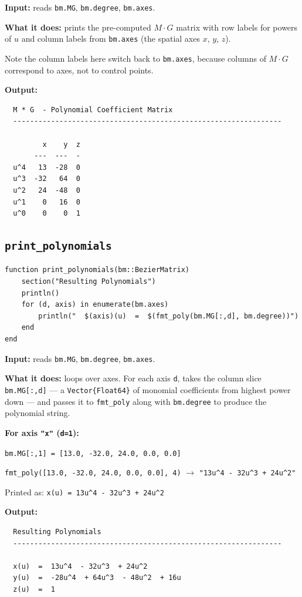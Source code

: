 \documentclass[12pt, a4paper]{article}
\newcommand{\cd}[1]{\texttt{#1}}
\begin{document}
\textbf{Input:} reads \cd{bm.MG}, \cd{bm.degree}, \cd{bm.axes}.

\textbf{What it does:} prints the pre-computed $M \cdot G$
matrix with row labels for powers of $u$ and column labels
from \cd{bm.axes} (the spatial axes $x$, $y$, $z$).

Note the column labels here switch back to \cd{bm.axes},
because columns of $M \cdot G$ correspond to axes,
not to control points.

\textbf{Output:}
\begin{verbatim}
  M * G  - Polynomial Coefficient Matrix
  ----------------------------------------------------------------

         x    y  z
       ---  ---  -
  u^4   13  -28  0
  u^3  -32   64  0
  u^2   24  -48  0
  u^1    0   16  0
  u^0    0    0  1
\end{verbatim}

\subsection{\texttt{print\_polynomials}}

\begin{verbatim}
function print_polynomials(bm::BezierMatrix)
    section("Resulting Polynomials")
    println()
    for (d, axis) in enumerate(bm.axes)
        println("  $(axis)(u)  =  $(fmt_poly(bm.MG[:,d], bm.degree))")
    end
end
\end{verbatim}

\textbf{Input:} reads \cd{bm.MG}, \cd{bm.degree}, \cd{bm.axes}.

\textbf{What it does:} loops over axes.
For each axis \cd{d}, takes the column slice \cd{bm.MG[:,d]}
--- a \cd{Vector\{Float64\}} of monomial coefficients from
highest power down --- and passes it to \cd{fmt\_poly}
along with \cd{bm.degree} to produce the polynomial string.

\begin{examplebox}
\textbf{For axis \cd{"x"} (\cd{d=1}):}

\cd{bm.MG[:,1] = [13.0, -32.0, 24.0, 0.0, 0.0]}

\cd{fmt\_poly([13.0, -32.0, 24.0, 0.0, 0.0], 4)}
$\to$ \cd{"13u\^{}4  - 32u\^{}3  + 24u\^{}2"}

Printed as: \cd{x(u)  =  13u\^{}4  - 32u\^{}3  + 24u\^{}2}
\end{examplebox}

\textbf{Output:}
\begin{verbatim}
  Resulting Polynomials
  ----------------------------------------------------------------

  x(u)  =  13u^4  - 32u^3  + 24u^2
  y(u)  =  -28u^4  + 64u^3  - 48u^2  + 16u
  z(u)  =  1
\end{verbatim}
\end{document}
